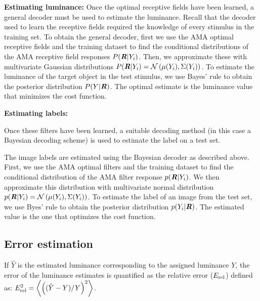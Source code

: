 \documentclass{jov}
\begin{document}
{\bf Estimating luminance:} 
Once the optimal receptive fields have been learned, a general decoder must be used to estimate the luminance. Recall that the decoder used to learn the receptive fields required the knowledge of every stimulus in the training set. To obtain the general decoder, first we use the AMA optimal receptive fields and the training dataset to find the conditional distributions of the AMA receptive field responses $P({\textbf {\textit R} }|Y_i)$. Then, we approximate these with multivariate Gaussian distributions $P({\textbf {\textit R} }|Y_i) = \mathcal{N}\left(\mu(Y_i),\Sigma(Y_i) \right)$. To estimate the luminance of the target object in the test stimulus, we use Bayes' rule to obtain the posterior distribution $P(Y|{\textbf {\textit R} })$. The optimal estimate is the luminance value that minimizes the cost function.

{\bf Estimating labels:} 

Once these filters have been learned, a suitable decoding method (in this case a Bayesian decoding scheme) is used to estimate the label on a test set.

The image labels are estimated using the Bayesian decoder as described above. First, we use the AMA optimal filters and the training dataset to find the conditional distribution of the AMA filter response $p({\textbf {\textit R} }|Y_i)$. We then approximate this distribution with multivariate normal distribution $p({\textbf {\textit R} }|Y_i) = \mathcal{N}\left(\mu(Y_i),\Sigma(Y_i) \right)$. To estimate the label of an image from the test set, we use Byes' rule to obtain the posterior distribution $p(Y_i|{\textbf {\textit R} })$. The estimated value is the one that optimizes the cost function.

\subsection{Error estimation}
If $\hat{Y}$ is the estimated luminance corresponding to the assigned luminance $Y$, the error of the luminance estimates is quantified as the relative error ($E_{\rm rel}$) defined as: $E_{\rm rel}^2 = \left\langle\left((\hat{Y}-Y)/Y\right)^2\right\rangle$.


\end{document}
